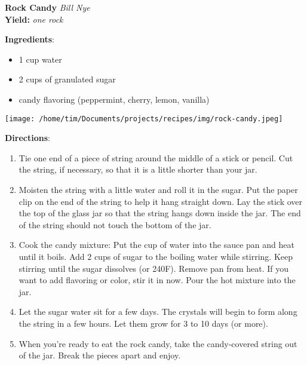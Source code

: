\documentclass[11pt, twoside, openany]{book}
\begin{document}
\noindent\begin{minipage}[t]{\linewidth}%
{\Large\textbf{Rock Candy}} \label{rock-candy}\hfill\textit{Bill Nye}\\
\textbf{Yield:} \textit{one rock}\\
\noindent\begin{minipage}[t]{0.78\linewidth}%
\textbf{Ingredients}:\vspace{-3mm}
\begin{multicols}{2}
\begin{itemize}\setlength\itemsep{-1mm}
\item 1 cup water
\item 2 cups of granulated sugar
\item candy flavoring (peppermint, cherry, lemon, vanilla)
\end{itemize}
\end{multicols}
\end{minipage}
\noindent\begin{minipage}[t]{0.18\linewidth}
\centering \strut\vspace*{-\baselineskip}\newline
\texttt{[image: /home/tim/Documents/projects/recipes/img/rock-candy.jpeg]}\\
\end{minipage}\vspace{3mm}
\textbf{Directions}:
\vspace{-3mm}\begin{enumerate}\setlength\itemsep{-1mm}
\item Tie one end of a piece of string around the middle of a stick or pencil. Cut the string, if necessary, so that it is a little shorter than your jar. 
\item Moisten the string with a little water and roll it in the sugar. Put the paper clip on the end of the string to help it hang straight down. Lay the stick over the top of the glass jar so that the string hangs down inside the jar. The end of the string should not touch the bottom of the jar. 
\item Cook the candy mixture: Put the cup of water into the sauce pan and heat until it boils. Add 2 cups of sugar to the boiling water while stirring. Keep stirring until the sugar dissolves (or 240F). Remove pan from heat. If you want to add flavoring or color, stir it in now. Pour the hot mixture into the jar. 
\item Let the sugar water sit for a few days. The crystals will begin to form along the string in a few hours. Let them grow for 3 to 10 days (or more).
\item When you're ready to eat the rock candy, take the candy-covered string out of the jar. Break the pieces apart and enjoy.
\end{enumerate}
\end{minipage}\vspace{8mm}
\end{document}
